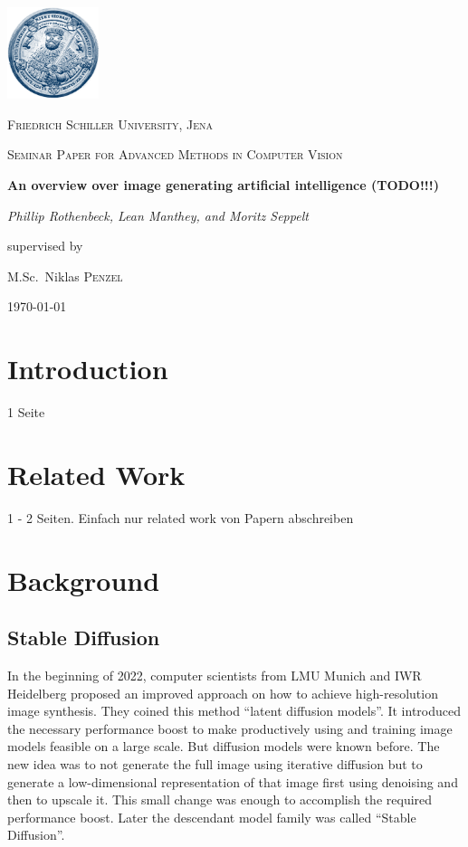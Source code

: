 \documentclass[11pt]{article}
\begin{document}
\begin{titlepage}
	\centering
	\includegraphics[width=0.2\textwidth]{assets/uni-logo.png}\par\vspace{0.5cm}
	{\scshape\LARGE Friedrich Schiller University, Jena \par}
	\vspace{1cm}
	{\scshape\Large Seminar Paper for Advanced Methods in Computer Vision\par}
	\vspace{1.5cm}
	{\huge\bfseries An overview over image generating artificial intelligence (TODO!!!)\par}
	\vspace{2cm}
	{\Large\itshape Phillip Rothenbeck, Lean Manthey, and Moritz Seppelt\par}
	\vfill
	supervised by\par
	M.Sc.~Niklas \textsc{Penzel}

	\vfill

	{\large \today\par}
\end{titlepage}

\tableofcontents
\newpage

\section{Introduction}
1 Seite

\section{Related Work}
1 - 2 Seiten. Einfach nur related work von Papern abschreiben
\section{Background}
\subsection{Stable Diffusion}
In the beginning of 2022, computer scientists from LMU Munich and IWR Heidelberg proposed an improved approach on how to achieve high-resolution image synthesis\cite{rombach2022stablediffusion}. They coined this method “latent diffusion models”. It introduced the necessary performance boost to make productively using and training image models feasible on a large scale. But diffusion models were known before. The new idea was to not generate the full image using iterative diffusion but to generate a low-dimensional representation of that image first using denoising and then to upscale it. This small change was enough to accomplish the required performance boost. Later the descendant model family was called “Stable Diffusion”.
\end{document}
